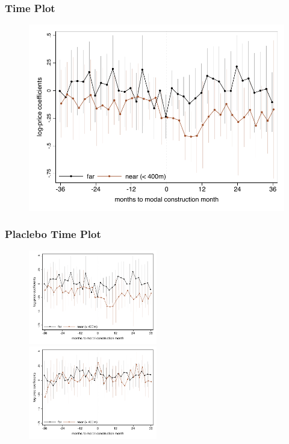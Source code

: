 \documentclass[aspectratio=149]{beamer}
\begin{document}

\begin{frame}
\frametitle{Time Plot}
\begin{center}
\begin{figure}

\includegraphics[scale=0.72]{figures/timeplot.pdf}

\end{figure}
\end{center}
\end{frame}


\begin{frame}
\frametitle{Placlebo Time Plot}
\begin{center}
\begin{figure}

\includegraphics[width=0.5\textwidth,trim={.77cm 0cm .21cm 0cm}]{figures/timeplot.pdf}
   \hfill
\includegraphics[width=0.5\textwidth,trim={.77cm 0cm .21cm 0cm},clip]{figures/timeplot_placebo.pdf}

\vspace{-3mm}
\end{figure}
\end{center}
\end{frame}
\end{document}
